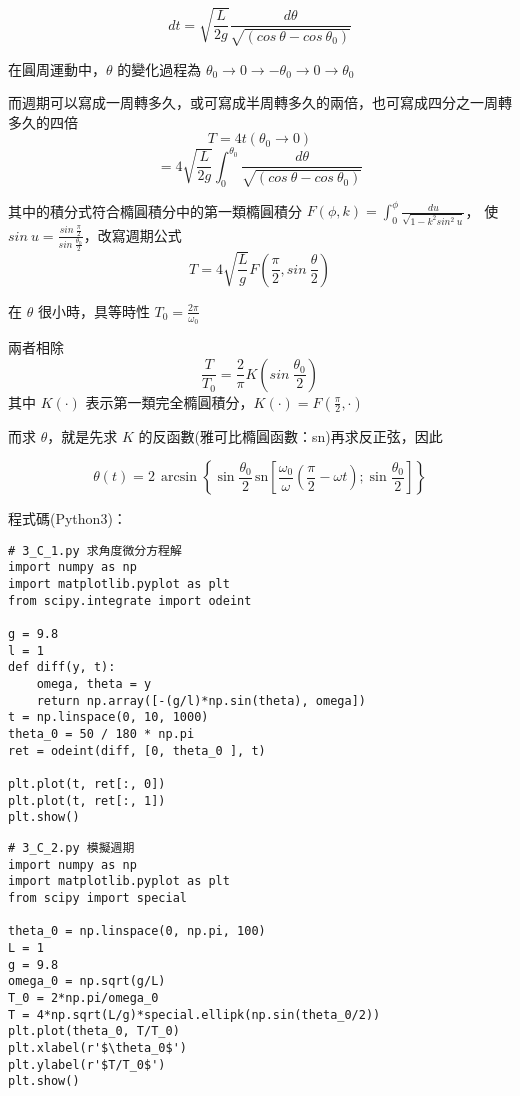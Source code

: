 \documentclass[UTF8,a4paper,12pt]{article}
\begin{document}
$$ dt = \sqrt{\frac{L}{2g}}\frac{d\theta}{\sqrt{(cos\ \theta - cos\ \theta_0)}} $$

在圓周運動中，$\theta$ 的變化過程為 $\theta_0 \rightarrow 0 \rightarrow -\theta_0 \rightarrow 0 \rightarrow \theta_0$

而週期可以寫成一周轉多久，或可寫成半周轉多久的兩倍，也可寫成四分之一周轉多久的四倍
$$T = 4t(\theta_0 \rightarrow 0)$$
$$ = 4 \sqrt{\frac{L}{2g}} \int^{\theta_0}_0 \frac{d\theta}{\sqrt{(cos\ \theta - cos\ \theta_0)}} $$

其中的積分式符合橢圓積分中的第一類橢圓積分 $F(\phi,k) = \int^{\phi}_0 \frac{du}{\sqrt{1-k^2sin^2\ u}} $，
使$sin\ u=\frac{sin\ \frac{\pi}{2}}{sin\ \frac{\theta_0}{2}}$，改寫週期公式 
$$T = 4\sqrt{\frac{L}{g}}F(\frac{\pi}{2},sin\ \frac{\theta}{2})$$

在 $\theta$ 很小時，具等時性 $T_0 = \frac{2\pi}{\omega_0}$

兩者相除
$$\frac{T}{T_0} = \frac{2}{\pi}K(sin\ \frac{\theta_0}{2})$$
其中 $K(\cdot)$ 表示第一類完全橢圓積分，$K(\cdot) = F(\frac{\pi}{2}, \cdot )$

而求 $\theta$，就是先求 $K$ 的反函數(雅可比橢圓函數：sn)再求反正弦，因此

$$\theta (t) = 2\,\arcsin \left\{ \sin\frac{\theta_0}{2} \, \mbox{sn} \left[ \frac{\omega_0}{\omega}\left(\frac{\pi}{2} - \omega t \right) 
 ; \sin \frac{\theta_0}{2} \right] \right\}$$


程式碼(Python3)：

\begin{lstlisting}
# 3_C_1.py 求角度微分方程解
import numpy as np
import matplotlib.pyplot as plt
from scipy.integrate import odeint

g = 9.8
l = 1
def diff(y, t):
    omega, theta = y
    return np.array([-(g/l)*np.sin(theta), omega])
t = np.linspace(0, 10, 1000)
theta_0 = 50 / 180 * np.pi
ret = odeint(diff, [0, theta_0 ], t)

plt.plot(t, ret[:, 0])
plt.plot(t, ret[:, 1])
plt.show()
\end{lstlisting}

\begin{lstlisting}
# 3_C_2.py 模擬週期
import numpy as np
import matplotlib.pyplot as plt
from scipy import special

theta_0 = np.linspace(0, np.pi, 100)
L = 1
g = 9.8
omega_0 = np.sqrt(g/L)
T_0 = 2*np.pi/omega_0
T = 4*np.sqrt(L/g)*special.ellipk(np.sin(theta_0/2))
plt.plot(theta_0, T/T_0)
plt.xlabel(r'$\theta_0$')
plt.ylabel(r'$T/T_0$')
plt.show()

\end{lstlisting}
\end{document}
